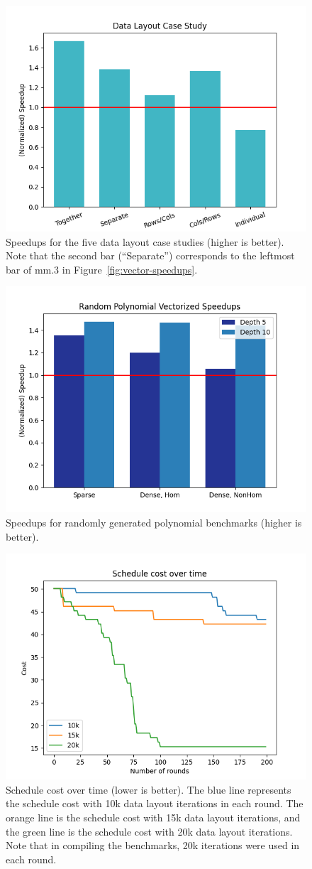 \begin{figure}
    \includegraphics[width=0.7\linewidth]{figures/graphs/case_study.png}
    \caption{Speedups for the five data layout case studies (higher is better). Note that the second bar (``Separate'') corresponds to the leftmost bar of {\sf mm.3} in Figure~\ref{fig:vector-speedups}.}
\end{figure}

\begin{figure}
    \includegraphics[width=0.7\linewidth]{figures/graphs/trees.png}
    \caption{Speedups for randomly generated polynomial benchmarks (higher is better).}
\end{figure}

\begin{figure}
    \includegraphics[width=0.7\linewidth]{figures/graphs/schedules.png}
    \caption{Schedule cost over time (lower is better). The blue line represents the schedule cost with 10k data layout iterations in each round. The orange line is the schedule cost with 15k data layout iterations, and the green line is the schedule cost with 20k data layout iterations. Note that in compiling the benchmarks, 20k iterations were used in each round.}
\end{figure}

